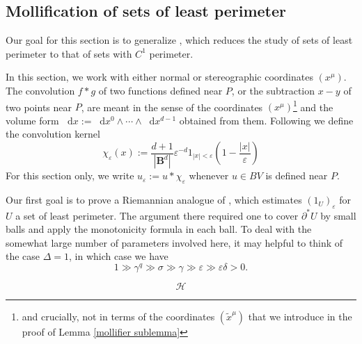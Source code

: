 \documentclass[reqno,10pt]{amsart}
\newcommand{\Ball}{\mathbf{B}}
\newcommand*\dif{\mathop{}\!\mathrm{d}}
\newcommand{\Hilb}{\mathcal H}
\theoremstyle{definition}
\numberwithin{equation}{section}
\begin{document}
\subsection{Mollification of sets of least perimeter}
Our goal for this section is to generalize \cite[Lemma 7.5]{Giusti77}, which reduces the study of sets of least perimeter to that of sets with $C^1$ perimeter.

In this section, we work with either normal or stereographic coordinates $(x^\mu)$.
The convolution $f * g$ of two functions defined near $P$, or the subtraction $x - y$ of two points near $P$, are meant in the sense of the coordinates $(x^\mu)$\footnote{and crucially, not in terms of the coordinates $(\tilde x^\mu)$ that we introduce in the proof of Lemma \ref{mollifier sublemma}} and the volume form $\dif x := \dif x^0 \wedge \cdots \wedge \dif x^{d - 1}$ obtained from them. Following \cite[Chapter 7]{Giusti77} we define the convolution kernel
$$\chi_\varepsilon(x) := \frac{d + 1}{|\Ball^d|} \varepsilon^{-d}1_{|x| < \varepsilon} \left(1 - \frac{|x|}{\varepsilon}\right)$$
For this section only, we write $u_\varepsilon := u * \chi_\varepsilon$ whenever $u \in BV$ is defined near $P$.

Our first goal is to prove a Riemannian analogue of \cite[Theorem 7.3]{Giusti77}, which estimates $(1_U)_\varepsilon$ for $U$ a set of least perimeter.
The argument there required one to cover $\partial^* U$ by small balls and apply the monotonicity formula in each ball.
To deal with the somewhat large number of parameters involved here, it may helpful to think of the case $\Delta = 1$, in which case we have
$$1 \gg \gamma^q \gg \sigma \gg \gamma \gg \varepsilon \gg \varepsilon \delta > 0.$$

\begin{equation}\label{compatible verticals}
    \Hilb
\end{equation}
\end{document}
